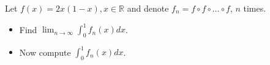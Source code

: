 Let \(f(x)=2x(1-x), x\in\mathbb{R}\) and denote \(f_n=f\circ f\circ \dots \circ f\), \(n\) times.\begin{itemize}

\item[(a)] Find \(\lim_{n\rightarrow\infty} \int^1_0 f_n(x)dx\).
\item[(b)] Now compute \(\int^1_0 f_n(x)dx\).
\end{itemize}
